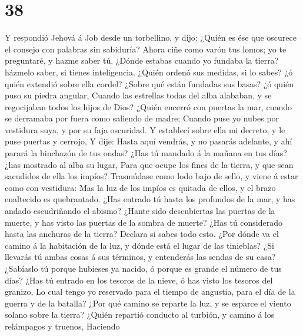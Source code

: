 \hypertarget{section-37}{%
\section{38}\label{section-37}}

 Y respondió Jehová á Job desde un torbellino, y dijo:
 ¿Quién es ése que oscurece el consejo con palabras sin
sabiduría?  Ahora ciñe como varón tus lomos; yo te
preguntaré, y hazme saber tú.  ¿Dónde estabas cuando yo
fundaba la tierra? házmelo saber, si tienes inteligencia. 
¿Quién ordenó sus medidas, si lo sabes? ¿ó quién extendió sobre ella
cordel?  ¿Sobre qué están fundadas sus basas? ¿ó quién puso
su piedra angular,  Cuando las estrellas todas del alba
alababan, y se regocijaban todos los hijos de Dios?  ¿Quién
encerró con puertas la mar, cuando se derramaba por fuera como saliendo
de madre;  Cuando puse yo nubes por vestidura suya, y por su
faja oscuridad.  Y establecí sobre ella mi decreto, y le
puse puertas y cerrojo,  Y dije: Hasta aquí vendrás, y no
pasarás adelante, y ahí parará la hinchazón de tus ondas? 
¿Has tú mandado á la mañana en tus días? ¿has mostrado al alba su lugar,
 Para que ocupe los fines de la tierra, y que sean
sacudidos de ella los impíos?  Trasmúdase como lodo bajo de
sello, y viene á estar como con vestidura:  Mas la luz de
los impíos es quitada de ellos, y el brazo enaltecido es quebrantado.
 ¿Has entrado tú hasta los profundos de la mar, y has
andado escudriñando el abismo?  ¿Hante sido descubiertas
las puertas de la muerte, y has visto las puertas de la sombra de
muerte?  ¿Has tú considerado hasta las anchuras de la
tierra? Declara si sabes todo esto.  ¿Por dónde va el
camino á la habitación de la luz, y dónde está el lugar de las
tinieblas?  ¿Si llevarás tú ambas cosas á sus términos, y
entenderás las sendas de su casa?  ¿Sabíaslo tú porque
hubieses ya nacido, ó porque es grande el número de tus días?
 ¿Has tú entrado en los tesoros de la nieve, ó has visto
los tesoros del granizo,  Lo cual tengo yo reservado para
el tiempo de angustia, para el día de la guerra y de la batalla?
 ¿Por qué camino se reparte la luz, y se esparce el viento
solano sobre la tierra?  ¿Quién repartió conducto al
turbión, y camino á los relámpagos y truenos,  Haciendo
